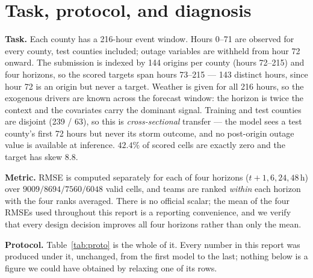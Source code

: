 \documentclass[10pt,letterpaper,twocolumn]{article}
\begin{document}
\section{Task, protocol, and diagnosis}
\label{sec:diag}

\textbf{Task.} Each county has a 216-hour event window. Hours 0--71 are
observed for every county, test counties included; outage variables are withheld
from hour 72 onward. The submission is indexed by 144 origins per county
(hours 72--215) and four horizons, so the scored targets span hours 73--215 ---
143 distinct hours, since hour 72 is an origin but never a target. Weather is
given for all 216 hours, so the exogenous drivers are known across the forecast
window: the horizon is twice the context and the covariates carry the dominant
signal. Training and test counties are disjoint (239 / 63), so this is
\emph{cross-sectional} transfer --- the model sees a test county's first 72
hours but never its storm outcome, and no post-origin outage value is available
at inference. $42.4\%$ of scored cells are exactly zero and the target has skew
$8.8$.

\textbf{Metric.} RMSE is computed separately for each of four horizons
($t{+}1,6,24,48$\,h) over $9009/8694/7560/6048$ valid cells, and teams are
ranked \emph{within} each horizon with the four ranks averaged. There is no
official scalar; the mean of the four RMSEs used throughout this report is a
reporting convenience, and we verify that every design decision improves all
four horizons rather than only the mean.

\textbf{Protocol.} Table~\ref{tab:proto} is the whole of it. Every number in
this report was produced under it, unchanged, from the first model to the last;
nothing below is a figure we could have obtained by relaxing one of its rows.
\end{document}
